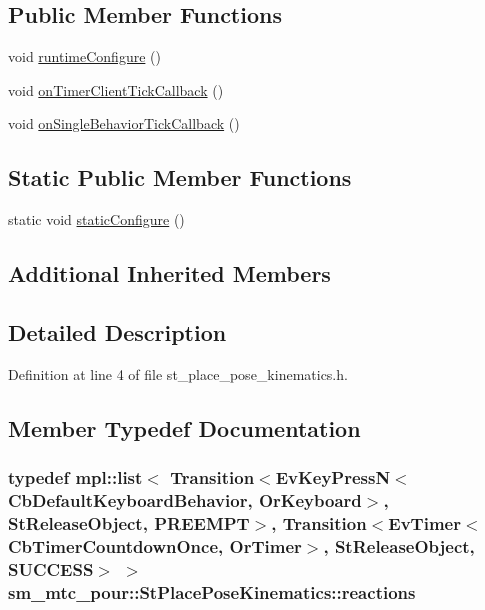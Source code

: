 \subsection*{Public Member Functions}
\begin{DoxyCompactItemize}
\item 
void \hyperlink{structsm__mtc__pour_1_1StPlacePoseKinematics_a69316441818e59bb5e9763443ddcc171}{runtime\+Configure} ()
\item 
void \hyperlink{structsm__mtc__pour_1_1StPlacePoseKinematics_abd7140e9f7aa51a7baa356cc7a1b7d8b}{on\+Timer\+Client\+Tick\+Callback} ()
\item 
void \hyperlink{structsm__mtc__pour_1_1StPlacePoseKinematics_aec84ec006953b71f477f1fcf62a146cd}{on\+Single\+Behavior\+Tick\+Callback} ()
\end{DoxyCompactItemize}
\subsection*{Static Public Member Functions}
\begin{DoxyCompactItemize}
\item 
static void \hyperlink{structsm__mtc__pour_1_1StPlacePoseKinematics_a77536db0a0cc25be412a80eeec12957b}{static\+Configure} ()
\end{DoxyCompactItemize}
\subsection*{Additional Inherited Members}


\subsection{Detailed Description}


Definition at line 4 of file st\+\_\+place\+\_\+pose\+\_\+kinematics.\+h.



\subsection{Member Typedef Documentation}
\subsubsection[{\texorpdfstring{reactions}{reactions}}]{\setlength{\rightskip}{0pt plus 5cm}typedef mpl\+::list$<$ Transition$<$Ev\+Key\+PressN$<$Cb\+Default\+Keyboard\+Behavior, {\bf Or\+Keyboard}$>$, {\bf St\+Release\+Object}, {\bf P\+R\+E\+E\+M\+PT}$>$, Transition$<$Ev\+Timer$<$Cb\+Timer\+Countdown\+Once, {\bf Or\+Timer}$>$, {\bf St\+Release\+Object}, {\bf S\+U\+C\+C\+E\+SS}$>$ $>$ {\bf sm\+\_\+mtc\+\_\+pour\+::\+St\+Place\+Pose\+Kinematics\+::reactions}}\hypertarget{structsm__mtc__pour_1_1StPlacePoseKinematics_ace05ebd485c04ce1d4b81b24bf6d2306}{}\label{structsm__mtc__pour_1_1StPlacePoseKinematics_ace05ebd485c04ce1d4b81b24bf6d2306}


